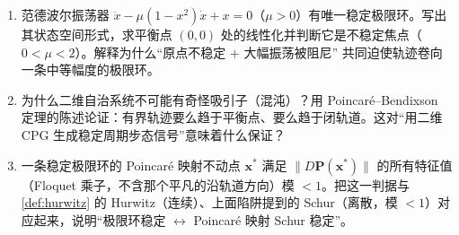\begin{practice}
\begin{enumerate}
  \item 范德波尔振荡器 $\ddot x-\mu(1-x^2)\dot x+x=0$（$\mu>0$）有唯一稳定极限环。写出其状态空间形式，求平衡点 $(0,0)$ 处的线性化并判断它是不稳定焦点（$0<\mu<2$）。解释为什么“原点不稳定 $+$ 大幅振荡被阻尼” 共同迫使轨迹卷向一条中等幅度的极限环。
  \item 为什么二维自治系统不可能有奇怪吸引子（混沌）？用 Poincaré--Bendixson 定理的陈述论证：有界轨迹要么趋于平衡点、要么趋于闭轨道。这对“用二维 CPG 生成稳定周期步态信号”意味着什么保证？
  \item 一条稳定极限环的 Poincaré 映射不动点 $\mathbf{x}^*$ 满足 $\|D\mathbf{P}(\mathbf{x}^*)\|$ 的所有特征值（Floquet 乘子，不含那个平凡的沿轨道方向）模 $<1$。把这一判据与 \cref{def:hurwitz} 的 Hurwitz（连续）、上面陷阱提到的 Schur（离散，模 $<1$）对应起来，说明“极限环稳定 $\leftrightarrow$ Poincaré 映射 Schur 稳定”。
\end{enumerate}
\end{practice}

